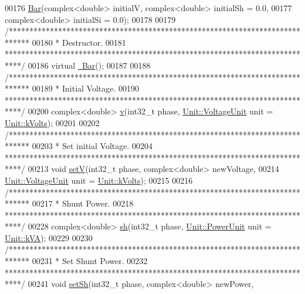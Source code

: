 \begin{DoxyCode}
00176   \hyperlink{group___models_ga9cae2188fcc6cce41caa7898c64548d1}{Bar}(complex<double> initialV, complex<double> initialSh = 0.0,
00177       complex<double> initialSi = 0.0);
00178 
00179   \textcolor{comment}{/*****************************************************************************}
00180 \textcolor{comment}{   * Destructor.}
00181 \textcolor{comment}{   ****************************************************************************/}
00186   \textcolor{keyword}{virtual} \hyperlink{group___models_ga9c7ebea0c189423591741ac438985316}{~Bar}();
00187 
00188   \textcolor{comment}{/*****************************************************************************}
00189 \textcolor{comment}{   * Initial Voltage.}
00190 \textcolor{comment}{   ****************************************************************************/}
00200   complex<double> \hyperlink{group___models_ga1e6f2daec86407118656d88170d1adc2}{v}(int32\_t phase, \hyperlink{class_unit_a55b07dfa9457e1eca2c7194fe0cfc3c1}{Unit::VoltageUnit} unit = 
      \hyperlink{class_unit_a55b07dfa9457e1eca2c7194fe0cfc3c1aa54b2473993a702a3923525765bd6e4c}{Unit::kVolts});
00201 
00202   \textcolor{comment}{/*****************************************************************************}
00203 \textcolor{comment}{   * Set initial Voltage.}
00204 \textcolor{comment}{   ****************************************************************************/}
00213   \textcolor{keywordtype}{void} \hyperlink{group___models_ga9b6fbc92674bfcdc9d5090795ab335a6}{setV}(int32\_t phase, complex<double> newVoltage,
00214             \hyperlink{class_unit_a55b07dfa9457e1eca2c7194fe0cfc3c1}{Unit::VoltageUnit} unit = \hyperlink{class_unit_a55b07dfa9457e1eca2c7194fe0cfc3c1aa54b2473993a702a3923525765bd6e4c}{Unit::kVolts});
00215 
00216   \textcolor{comment}{/*****************************************************************************}
00217 \textcolor{comment}{   * Shunt Power.}
00218 \textcolor{comment}{   ****************************************************************************/}
00228   complex<double> \hyperlink{group___models_gac188071bf5f165b0acdaa4c8af82355c}{sh}(int32\_t phase, \hyperlink{class_unit_ace265ae255370ccacfd5370337572c3b}{Unit::PowerUnit} unit = 
      \hyperlink{class_unit_ace265ae255370ccacfd5370337572c3ba72b181a842ae2759488a2fa1410d3696}{Unit::kVA});
00229 
00230   \textcolor{comment}{/*****************************************************************************}
00231 \textcolor{comment}{   * Set Shunt Power.}
00232 \textcolor{comment}{   ****************************************************************************/}
00241   \textcolor{keywordtype}{void} \hyperlink{group___models_ga207abd3d0649a488e3c44cf2a501ed23}{setSh}(int32\_t phase, complex<double> newPower,

\end{DoxyCode}
